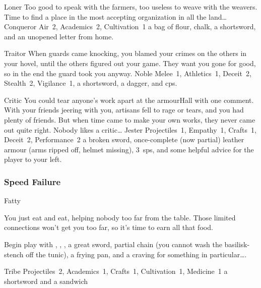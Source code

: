 \begin{multicols}{2}
\begin{itemize}
    {Loner}%
    {Too good to speak with the farmers, too useless to weave with the weavers.
      Time to find a place in the most accepting organization in all the land\ldots}%
    {Conqueror}%
    {
      Air~2, Academics~2, Cultivation~1
    }%
    {a bag of flour, chalk, a shortsword, and an unopened letter from home.}%

    {Traitor}%
    {
      When guards came knocking, you blamed your crimes on the others in your hovel, until the others figured out your game.
      They want you gone for good, so in the end the \gls{guard} took you anyway.
    }%
    {Noble}%
    {
      Melee~1, Athletics~1, Deceit~2, Stealth~2, Vigilance~1,
    }%
    {a shortsword, a dagger, and  \glspl{cp}.}%

    {Critic}%
    {
      You could tear anyone's work apart at the \gls{armourHall} with one comment.
      With your friends jeering with you, artisans fell to rage or tears, and you had plenty of friends.
      But when time came to make your own works, they never came out quite right.
      Nobody likes a critic\ldots
    }%
    {Jester}%
    {
      Projectiles~1, Empathy~1, Crafts~1, Deceit~2, Performance~2
    }%
    {a broken sword, once-complete (now partial) leather armour (arms ripped off, helmet missing), 3~\glspl{sp}, and some helpful advice for the player to your left.}%

\end{itemize}

\needspace{16em}
\subsubsection{Speed Failure}

\begin{itemize}

    {Fatty}%
    {
      You just eat and eat, helping nobody too far from the table.
      Those limited connections won't get you too far, so it's time to earn all that food.

      Begin play with \rations, \rations, \rations, a great sword, partial chain (you cannot wash the \gls{basilisk}-stench off the tunic), a frying pan, and a craving for something in particular\ldots.
    }%
    {Tribe}%
    {Projectiles~2, Academics~1, Crafts~1, Cultivation~1, Medicine~1}%
    {a shortsword and a sandwich}%


\end{itemize}
\end{multicols}
